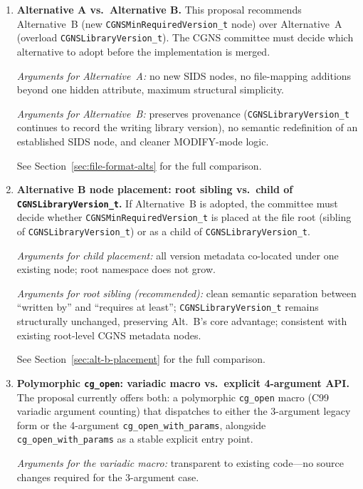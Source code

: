 \documentclass[11pt,letterpaper]{article}
\begin{document}
\begin{enumerate}[leftmargin=2em]

\item \textbf{Alternative A vs.\ Alternative B.}
  This proposal recommends Alternative~B (new
  \texttt{CGNSMinRequiredVersion\_t} node) over Alternative~A
  (overload \texttt{CGNSLibraryVersion\_t}).  The CGNS committee
  must decide which alternative to adopt before the implementation
  is merged.

  \textit{Arguments for Alternative~A:} no new SIDS nodes, no
  file-mapping additions beyond one hidden attribute, maximum
  structural simplicity.

  \textit{Arguments for Alternative~B:} preserves provenance
  (\texttt{CGNSLibraryVersion\_t} continues to record the writing
  library version), no semantic redefinition of an established SIDS
  node, and cleaner MODIFY-mode logic.

  See Section~\ref{sec:file-format-alts} for the full comparison.

\item \textbf{Alternative B node placement: root sibling vs.\
  child of \texttt{CGNSLibraryVersion\_t}.}
  If Alternative~B is adopted, the committee must decide whether
  \texttt{CGNSMinRequiredVersion\_t} is placed at the file root
  (sibling of \texttt{CGNSLibraryVersion\_t}) or as a child of
  \texttt{CGNSLibraryVersion\_t}.

  \textit{Arguments for child placement:} all version metadata
  co-located under one existing node; root namespace does not grow.

  \textit{Arguments for root sibling (recommended):} clean semantic
  separation between ``written by'' and ``requires at least'';
  \texttt{CGNSLibraryVersion\_t} remains structurally unchanged,
  preserving Alt.~B's core advantage; consistent with existing
  root-level CGNS metadata nodes.

  See Section~\ref{sec:alt-b-placement} for the full comparison.

\item \textbf{Polymorphic \texttt{cg\_open}: variadic macro vs.\
  explicit 4-argument API.}
  The proposal currently offers both: a polymorphic
  \texttt{cg\_open} macro (C99 variadic argument counting) that
  dispatches to either the 3-argument legacy form or the
  4-argument \texttt{cg\_open\_with\_params}, alongside
  \texttt{cg\_open\_with\_params} as a stable explicit entry point.

  \textit{Arguments for the variadic macro:} transparent to
  existing code---no source changes required for the 3-argument
  case.


\end{enumerate}
\end{document}
